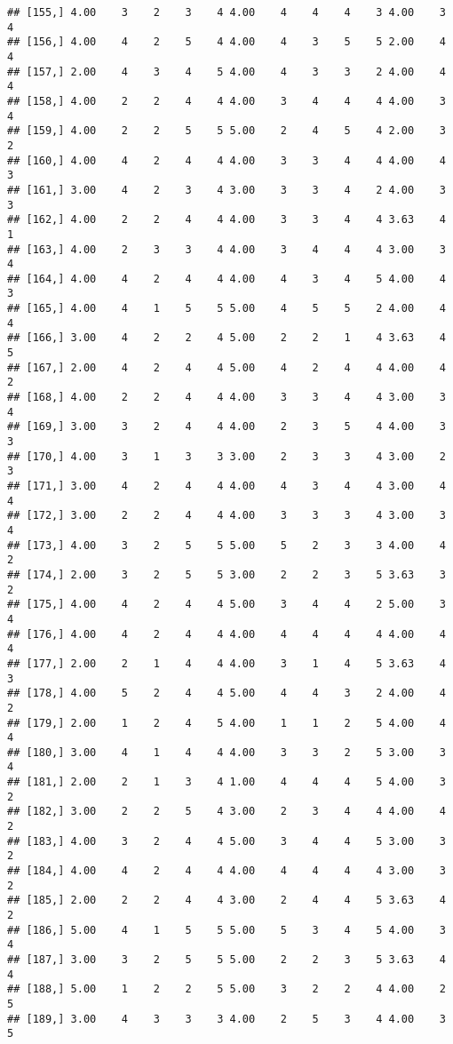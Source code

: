 \documentclass[]{article}
\begin{document}
\begin{verbatim}
## [155,] 4.00    3    2    3    4 4.00    4    4    4    3 4.00    3    4
## [156,] 4.00    4    2    5    4 4.00    4    3    5    5 2.00    4    4
## [157,] 2.00    4    3    4    5 4.00    4    3    3    2 4.00    4    4
## [158,] 4.00    2    2    4    4 4.00    3    4    4    4 4.00    3    4
## [159,] 4.00    2    2    5    5 5.00    2    4    5    4 2.00    3    2
## [160,] 4.00    4    2    4    4 4.00    3    3    4    4 4.00    4    3
## [161,] 3.00    4    2    3    4 3.00    3    3    4    2 4.00    3    3
## [162,] 4.00    2    2    4    4 4.00    3    3    4    4 3.63    4    1
## [163,] 4.00    2    3    3    4 4.00    3    4    4    4 3.00    3    4
## [164,] 4.00    4    2    4    4 4.00    4    3    4    5 4.00    4    3
## [165,] 4.00    4    1    5    5 5.00    4    5    5    2 4.00    4    4
## [166,] 3.00    4    2    2    4 5.00    2    2    1    4 3.63    4    5
## [167,] 2.00    4    2    4    4 5.00    4    2    4    4 4.00    4    2
## [168,] 4.00    2    2    4    4 4.00    3    3    4    4 3.00    3    4
## [169,] 3.00    3    2    4    4 4.00    2    3    5    4 4.00    3    3
## [170,] 4.00    3    1    3    3 3.00    2    3    3    4 3.00    2    3
## [171,] 3.00    4    2    4    4 4.00    4    3    4    4 3.00    4    4
## [172,] 3.00    2    2    4    4 4.00    3    3    3    4 3.00    3    4
## [173,] 4.00    3    2    5    5 5.00    5    2    3    3 4.00    4    2
## [174,] 2.00    3    2    5    5 3.00    2    2    3    5 3.63    3    2
## [175,] 4.00    4    2    4    4 5.00    3    4    4    2 5.00    3    4
## [176,] 4.00    4    2    4    4 4.00    4    4    4    4 4.00    4    4
## [177,] 2.00    2    1    4    4 4.00    3    1    4    5 3.63    4    3
## [178,] 4.00    5    2    4    4 5.00    4    4    3    2 4.00    4    2
## [179,] 2.00    1    2    4    5 4.00    1    1    2    5 4.00    4    4
## [180,] 3.00    4    1    4    4 4.00    3    3    2    5 3.00    3    4
## [181,] 2.00    2    1    3    4 1.00    4    4    4    5 4.00    3    2
## [182,] 3.00    2    2    5    4 3.00    2    3    4    4 4.00    4    2
## [183,] 4.00    3    2    4    4 5.00    3    4    4    5 3.00    3    2
## [184,] 4.00    4    2    4    4 4.00    4    4    4    4 3.00    3    2
## [185,] 2.00    2    2    4    4 3.00    2    4    4    5 3.63    4    2
## [186,] 5.00    4    1    5    5 5.00    5    3    4    5 4.00    3    4
## [187,] 3.00    3    2    5    5 5.00    2    2    3    5 3.63    4    4
## [188,] 5.00    1    2    2    5 5.00    3    2    2    4 4.00    2    5
## [189,] 3.00    4    3    3    3 4.00    2    5    3    4 4.00    3    5

\end{verbatim}
\end{document}
